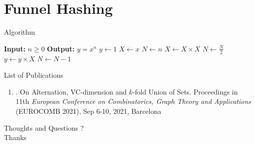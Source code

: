 \documentclass{beamer}
\begin{document}
\section{Funnel Hashing}

%
\begin{frame}{Algorithm}
	\begin{center}
		
	\begin{algorithmic}[1]
		\STATE \textbf{Input:} $n \geq 0$
		\STATE \textbf{Output:} $y = x^n$
		\STATE $y \gets 1$
		\STATE $X \gets x$
		\STATE $N \gets n$
		\STATE $X \gets X \times X$
		\STATE $N \gets \frac{N}{2}$
		\ELSE
		\STATE $y \gets y \times X$
		\STATE $N \gets N - 1$
		\ENDIF
		\ENDWHILE
	\end{algorithmic}
\end{center}
\end{frame}

\begin{frame}
{\Large List of Publications }
\begin{enumerate}
\item {\color{blue}{Amit Roy and Jayalal Sarma}}.  On Alternation, VC-dimension and $k$-fold Union of Sets. Proceedings in 11th {\em European Conference on Combinatorics, Graph Theory and Applications} (EUROCOMB 2021), Sep 6-10, 2021, Barcelona 
\end{enumerate}
\end{frame}


\begin{frame}
\begin{center}
{\sc \LARGE Thoughts and Questions ?} \\
\vspace{3cm}
{\sc \large Thanks} 
\end{center}
\end{frame}





\end{document}

